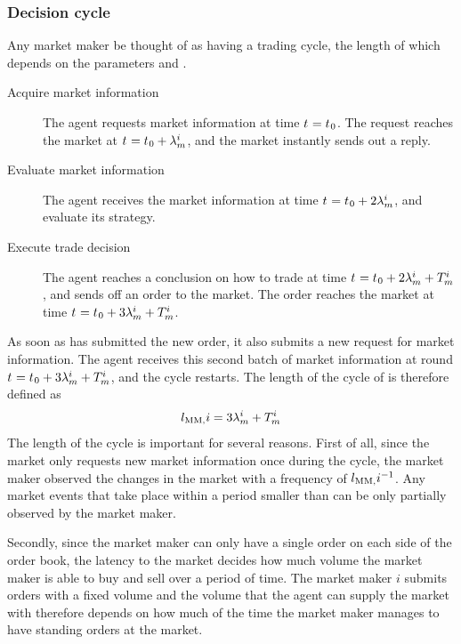 \subsubsection{Decision cycle}\label{section_tradeCycles}
Any market maker  be thought of as having a trading cycle, the length of which depends on the parameters  and . 
\begin{description}
\item[Acquire market information] The agent requests market information at time $t_{} = t_{}{_0}$. The request reaches the market at $t_{} = t_{}{_0} + \lambda_m^{i}$, and the market instantly sends out a reply.
\item[Evaluate market information] The agent receives the market information at time $t_{} = t_{}{_0} +  2\lambda_m^{i}$, and evaluate its strategy. 
\item[Execute trade decision] The agent reaches a conclusion on how to trade at time $t_{} = t_{}{_0} + 2\lambda_m^{i} + T_m^{i}$, and sends off an order to the market. The order reaches the market at time $t_{} = t_{}{_0} + 3\lambda_m^{i} + T_m^{i}$.
\end{description}
As soon as  has submitted the new order, it also submits a new request for market information. The agent receives this second batch of market information at round $t_{} = t_{}{_0} + 3\lambda_m^{i} + T_m^{i}$, and the cycle restarts. The length of the cycle of  is therefore defined as
\begin{equation}
l_{\text{MM}, {}}{i} = 3\lambda_m^{i} + T_m^{i}
\end{equation}
The length of the cycle is important for several reasons. First of all, since the market only requests new market information once during the cycle, the market maker observed the changes in the market with a frequency of $l_{\text{MM}, {}}{i}^{-1}$. Any market events that take place within a period smaller than  can be only partially observed by the market maker.

Secondly, since the market maker can only have a single order on each side of the order book, the latency to the market decides how much volume the market maker is able to buy and sell over a period of time. The market maker $i$ submits orders with a fixed volume  and the volume that the agent can supply the market with therefore depends on how much of the time the market maker manages to have standing orders at the market.

